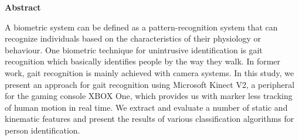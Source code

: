 \begin{center}
\begin{huge}
\bfseries{Abstract}
\end{huge}
\end{center}

\noindent {} A biometric system can be defined as a pattern-recognition system that can recognize individuals based on the characteristics of their physiology or behaviour. One biometric technique for unintrusive identification is gait recognition which basically identifies people by the way they walk. In former work, gait recognition is mainly achieved with camera systems. In this study, we present an approach for gait recognition using Microsoft Kinect V2, a peripheral for the gaming console XBOX One, which provides us with marker less tracking of human motion in real time. We extract and evaluate a number of static and kinematic features and present the results of various classification algorithms for person identification.
\pagebreak
